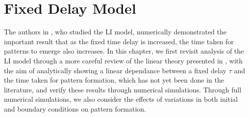 \chapter{Fixed Delay Model}

The authors in \cite{gaffmonk}, who studied the LI model, numerically demonstrated the important result that as the fixed time delay is increased, the time taken for patterns to emerge also increases. In this chapter, we first revisit analysis of the LI model through a more careful review of the linear theory presented in \cite{yigaffneyli,jiang}, with the aim of analytically showing a linear dependance between a fixed delay $\tau$ and the time taken for pattern formation, which has not yet been done in the literature, and verify these results through numerical simulations. Through full numerical simulations, we also consider the effects of variations in both initial and boundary conditions on pattern formation.

